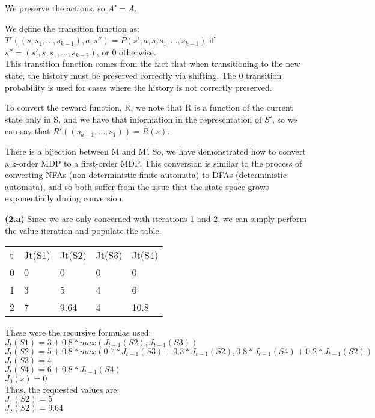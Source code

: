 \documentclass[11pt]{article}
\renewcommand{\part}[1] {\vspace{.10in} {\bf (#1)}}
\begin{document}
We preserve the actions, so $A' = A$. 

We define the transition function as:\\
$T'((s, s_1, ..., s_{k-1}), a, s'') = P(s', a, s, s_1, ..., s_{k-1})$ if $s'' = (s', s, s_1, ..., s_{k-2})$, or 0 otherwise.\\
This transition function comes from the fact that when transitioning to the new state, the history must be preserved correctly via shifting. The 0 transition probability is used for cases where the history is not correctly preserved.

To convert the reward function, R, we note that R is a function of the current state only in S, and we have that information in the representation of $S'$, so we can say that $R'((s_{k-1}, ..., s_1)) = R(s)$. 

There is a bijection between M and M'. So, we have demonstrated how to convert a k-order MDP to a first-order MDP. This conversion is similar to the process of converting NFAs (non-deterministic finite automata) to DFAs (deterministic automata), and so both suffer from the issue that the state space grows exponentially during conversion. 


\part{2.a}
Since we are only concerned with iterations 1 and 2, we can simply perform the value iteration and populate the table.

\begin{tabular}{|l|l|l|l|l|}
t & Jt(S1) & Jt(S2) & Jt(S3) & Jt(S4) \\
0 & 0 & 0 & 0 & 0 \\
1 & 3 & 5 & 4 & 6 \\
2 & 7 & 9.64 & 4 & 10.8 \\
\end{tabular}

These were the recursive formulas used:\\
$J_t(S1) = 3 + 0.8 * max(J_{t-1}(S2), J_{t-1}(S3))$\\
$J_t(S2) = 5 + 0.8 * max(0.7*J_{t-1}(S3)+0.3*J_{t-1}(S2), 0.8*J_{t-1}(S4)+0.2*J_{t-1}(S2))$\\
$J_t(S3) = 4$\\
$J_t(S4) = 6 + 0.8 * J_{t-1}(S4)$\\
$J_0(s) = 0$\\

Thus, the requested values are:\\
$J_1(S2) = 5$\\
$J_2(S2) = 9.64$\\
\end{document}
